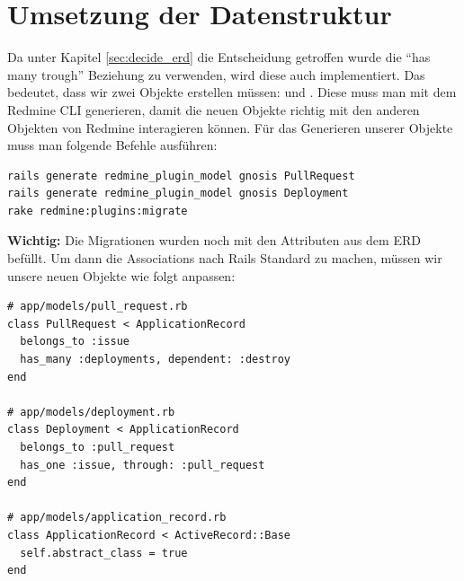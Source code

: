 \begin{minipage}{\textwidth}
  \section{Umsetzung der Datenstruktur}
  Da unter Kapitel \ref{sec:decide_erd} die Entscheidung getroffen wurde die \enquote{has many trough} Beziehung zu
  verwenden, wird diese auch implementiert. Das bedeutet, dass wir zwei Objekte erstellen müssen: 
   und . Diese muss man mit dem Redmine CLI generieren,
  damit die neuen Objekte richtig mit den anderen Objekten von Redmine interagieren können. Für das Generieren unserer
  Objekte muss man folgende Befehle ausführen:
  \begin{codebox}[]
    \begin{verbatim}
rails generate redmine_plugin_model gnosis PullRequest 
rails generate redmine_plugin_model gnosis Deployment
rake redmine:plugins:migrate
    \end{verbatim}
  \end{codebox}
  \textbf{Wichtig:} Die Migrationen wurden noch mit den Attributen aus dem ERD befüllt. \newline
  Um dann die Associations nach Rails Standard zu machen, müssen wir unsere neuen Objekte wie folgt anpassen:
  \begin{codebox}[]
    \begin{verbatim}
# app/models/pull_request.rb
class PullRequest < ApplicationRecord
  belongs_to :issue
  has_many :deployments, dependent: :destroy
end

# app/models/deployment.rb
class Deployment < ApplicationRecord
  belongs_to :pull_request
  has_one :issue, through: :pull_request
end

# app/models/application_record.rb
class ApplicationRecord < ActiveRecord::Base
  self.abstract_class = true
end
    \end{verbatim}
  \end{codebox}
\end{minipage}

